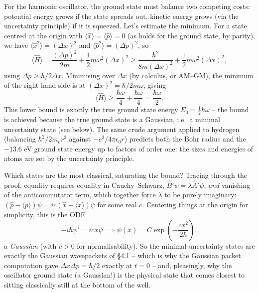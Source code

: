 \documentclass[a4paper]{scrartcl}
\begin{document}
\begin{example}
    For the harmonic oscillator, the ground state must balance two competing costs: potential energy grows if the state spreads out, kinetic energy grows (via the uncertainty principle) if it is squeezed. Let's estimate the minimum. For a state centred at the origin with $\langle \hat x \rangle = \langle \hat p \rangle = 0$ (as holds for the ground state, by parity), we have $\langle \hat{x}^2 \rangle = (\Delta x)^2$ and $\langle \hat{p}^2 \rangle = (\Delta p)^2$, so
    $$
    \langle \hat{H} \rangle = \frac{(\Delta p)^2}{2m} + \frac{1}{2} m \omega^2 (\Delta x)^2
    \geq \frac{\hbar^2}{8 m (\Delta x)^2} + \frac{1}{2} m \omega^2 (\Delta x)^2,
    $$
    using $\Delta p \geq \hbar / 2 \Delta x$. Minimising over $\Delta x$ (by calculus, or AM--GM), the minimum of the right hand side is at $(\Delta x)^2 = \hbar/2m\omega$, giving
    $$
    \langle \hat{H} \rangle \geq \frac{\hbar \omega}{4} + \frac{\hbar \omega}{4} = \frac{\hbar \omega}{2}.
    $$
    This lower bound is exactly the true ground state energy $E_0 = \frac{1}{2}\hbar\omega$ -- the bound is achieved because the true ground state is a Gaussian, i.e.\ a minimal uncertainty state (see below). The same crude argument applied to hydrogen (balancing $\hbar^2/2m_e r^2$ against $-e^2/4\pi\epsilon_0 r$) predicts both the Bohr radius and the $-13.6$ eV ground state energy up to factors of order one: the sizes and energies of atoms are set by the uncertainty principle.
\end{example}

Which states are the most classical, saturating the bound? Tracing through the proof, equality requires equality in Cauchy--Schwarz, $\hat{B}'\psi = \lambda \hat{A}'\psi$, \emph{and} vanishing of the anticommutator term, which together force $\lambda$ to be purely imaginary: $(\hat{p} - \langle p \rangle)\psi = i c (\hat{x} - \langle x \rangle)\psi$ for some real $c$. Centering things at the origin for simplicity, this is the ODE
$$
-i\hbar \psi' = i c x \psi \implies \psi(x) = C \exp\left(-\frac{c x^2}{2\hbar}\right),
$$
a \emph{Gaussian} (with $c > 0$ for normalisability). So the minimal-uncertainty states are exactly the Gaussian wavepackets of \S 4.1 -- which is why the Gaussian packet computation gave $\Delta x \Delta p = \hbar/2$ exactly at $t = 0$ -- and, pleasingly, why the oscillator ground state (a Gaussian!) is the physical state that comes closest to sitting classically still at the bottom of the well.
\end{document}
